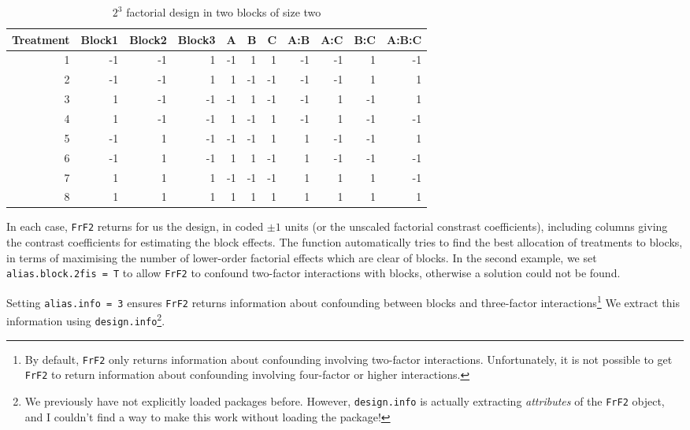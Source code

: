 \documentclass[
]{book}
\theoremstyle{definition}
\theoremstyle{definition}
\theoremstyle{definition}
\theoremstyle{definition}
\theoremstyle{remark}
\begin{document}
\begin{table}

\caption{\label{tab:frf2-block-2}$2^3$ factorial design in two blocks of size two}
\centering
\begin{tabular}[t]{r|r|r|r|r|r|r|r|r|r|r}
\hline
Treatment & Block1 & Block2 & Block3 & A & B & C & A:B & A:C & B:C & A:B:C\\
\hline
1 & -1 & -1 & 1 & -1 & 1 & 1 & -1 & -1 & 1 & -1\\
\hline
2 & -1 & -1 & 1 & 1 & -1 & -1 & -1 & -1 & 1 & 1\\
\hline
3 & 1 & -1 & -1 & -1 & 1 & -1 & -1 & 1 & -1 & 1\\
\hline
4 & 1 & -1 & -1 & 1 & -1 & 1 & -1 & 1 & -1 & -1\\
\hline
5 & -1 & 1 & -1 & -1 & -1 & 1 & 1 & -1 & -1 & 1\\
\hline
6 & -1 & 1 & -1 & 1 & 1 & -1 & 1 & -1 & -1 & -1\\
\hline
7 & 1 & 1 & 1 & -1 & -1 & -1 & 1 & 1 & 1 & -1\\
\hline
8 & 1 & 1 & 1 & 1 & 1 & 1 & 1 & 1 & 1 & 1\\
\hline
\end{tabular}
\end{table}

In each case, \texttt{FrF2} returns for us the design, in coded \(\pm 1\) units (or the unscaled factorial constrast coefficients), including columns giving the contrast coefficients for estimating the block effects. The function automatically tries to find the best allocation of treatments to blocks, in terms of maximising the number of lower-order factorial effects which are clear of blocks. In the second example, we set \texttt{alias.block.2fis\ =\ T} to allow \texttt{FrF2} to confound two-factor interactions with blocks, otherwise a solution could not be found.

Setting \texttt{alias.info\ =\ 3} ensures \texttt{FrF2} returns information about confounding between blocks and three-factor interactions\footnote{By default, \texttt{FrF2} only returns information about confounding involving two-factor interactions. Unfortunately, it is not possible to get \texttt{FrF2} to return information about confounding involving four-factor or higher interactions.} We extract this information using \texttt{design.info}\footnote{We previously have not explicitly loaded packages before. However, \texttt{design.info} is actually extracting \emph{attributes} of the \texttt{FrF2} object, and I couldn't find a way to make this work without loading the package!}.
\end{document}
